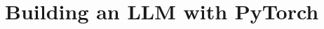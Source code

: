 \documentclass[../../../main.tex]{subfiles}
\begin{document}
\section{Building an LLM with PyTorch}
\end{document}
